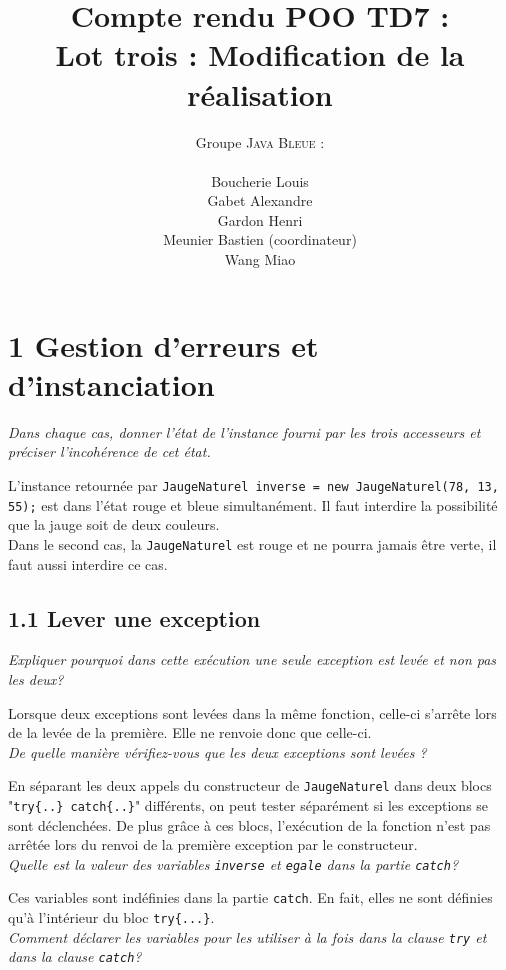\documentclass{article}
\author{Groupe \textsc{Java Bleue} :\\ \\Boucherie Louis\\Gabet Alexandre\\Gardon Henri\\Meunier Bastien (coordinateur)\\Wang Miao }
\title{Compte rendu POO TD7 :\\ Lot trois : Modification de la réalisation}
\begin{document}
\maketitle
\newpage
\section*{1 Gestion d'erreurs et d'instanciation}

\noindent \emph{Dans chaque cas, donner l'état de l'instance fourni par les trois accesseurs et préciser l'incohérence de cet état.}

L'instance retournée par \texttt{JaugeNaturel inverse = new JaugeNaturel(78, 13, 55);} est dans l'état rouge
et bleue simultan\'ement. Il faut interdire la possibilité que la jauge soit de deux couleurs.\\
Dans le second cas, la \texttt{JaugeNaturel} est rouge et ne pourra jamais être verte, il faut aussi interdire ce cas.

\subsection*{1.1 Lever une exception}
\noindent \emph{Expliquer pourquoi dans cette exécution une seule exception est levée et non pas les deux?}

Lorsque deux exceptions sont levées dans la même fonction, celle-ci s'arrête lors de la levée de la première. Elle ne renvoie donc que celle-ci.\\

\noindent \emph{De quelle manière vérifiez-vous que les deux exceptions sont levées ?}

En séparant les deux appels du constructeur de \texttt{JaugeNaturel} dans deux blocs "\texttt{try\{..\} catch\{..\}}" différents, on peut tester séparément si les exceptions se sont déclenchées.
De plus grâce à ces blocs, l’exécution de la fonction n'est pas arrêtée lors du renvoi de la première exception par le constructeur.\\

\noindent \emph{Quelle est la valeur des variables \texttt{inverse} et \texttt{egale} dans la partie \texttt{catch}?}

Ces variables sont indéfinies dans la partie \texttt{catch}. En fait, elles ne sont définies qu'à l'intérieur du bloc \texttt{try\{...\}}.\\

\noindent \emph{Comment déclarer les variables pour les utiliser à la fois dans la clause \texttt{try} et dans la clause \texttt{catch}?}
\end{document}
